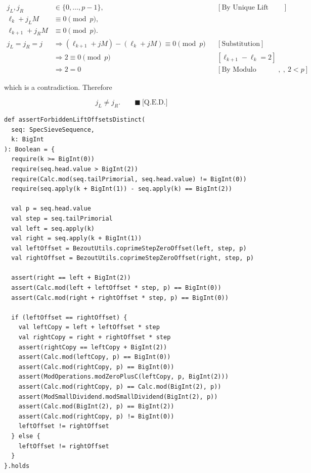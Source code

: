 \begin{equation*}
\begin{aligned}
j_L,j_R&\in\{0,\ldots,p-1\},
&&[\text{By Unique Lift Offset}]\\
\ell_k+j_LM&\equiv0\pmod p,\\
\ell_{k+1}+j_RM&\equiv0\pmod p.\\[2pt]
j_L=j_R=j
&\Longrightarrow
(\ell_{k+1}+jM)-(\ell_k+jM)\equiv0\pmod p
&&[\text{Substitution}]\\
&\Longrightarrow 2\equiv0\pmod p
&&[\ell_{k+1}-\ell_k=2]\\
&\Longrightarrow 2=0
&&[\text{By Modulo Property},\ 2\lt p],
\end{aligned}
\end{equation*}

which is a contradiction. Therefore

\begin{equation*}
j_L\ne j_R.
\qquad\blacksquare\ \text{[Q.E.D.]}
\end{equation*}

\begin{lstlisting}[style=scala]
def assertForbiddenLiftOffsetsDistinct(
  seq: SpecSieveSequence,
  k: BigInt
): Boolean = {
  require(k >= BigInt(0))
  require(seq.head.value > BigInt(2))
  require(Calc.mod(seq.tailPrimorial, seq.head.value) != BigInt(0))
  require(seq.apply(k + BigInt(1)) - seq.apply(k) == BigInt(2))

  val p = seq.head.value
  val step = seq.tailPrimorial
  val left = seq.apply(k)
  val right = seq.apply(k + BigInt(1))
  val leftOffset = BezoutUtils.coprimeStepZeroOffset(left, step, p)
  val rightOffset = BezoutUtils.coprimeStepZeroOffset(right, step, p)

  assert(right == left + BigInt(2))
  assert(Calc.mod(left + leftOffset * step, p) == BigInt(0))
  assert(Calc.mod(right + rightOffset * step, p) == BigInt(0))

  if (leftOffset == rightOffset) {
    val leftCopy = left + leftOffset * step
    val rightCopy = right + rightOffset * step
    assert(rightCopy == leftCopy + BigInt(2))
    assert(Calc.mod(leftCopy, p) == BigInt(0))
    assert(Calc.mod(rightCopy, p) == BigInt(0))
    assert(ModOperations.modZeroPlusC(leftCopy, p, BigInt(2)))
    assert(Calc.mod(rightCopy, p) == Calc.mod(BigInt(2), p))
    assert(ModSmallDividend.modSmallDividend(BigInt(2), p))
    assert(Calc.mod(BigInt(2), p) == BigInt(2))
    assert(Calc.mod(rightCopy, p) != BigInt(0))
    leftOffset != rightOffset
  } else {
    leftOffset != rightOffset
  }
}.holds
\end{lstlisting}

